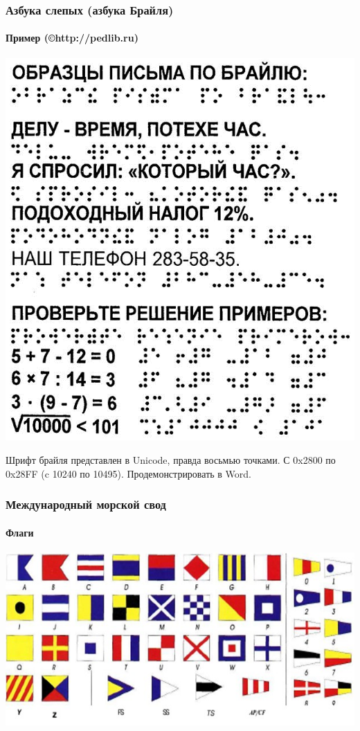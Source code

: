 \begin{frame}
    \frametitle{Азбука слепых (азбука Брайля)}
    \framesubtitle{Пример (\copyright http://pedlib.ru)}
    
    \begin{center}
        \includegraphics[height=.8\textheight]{fig/braileExample}
    \end{center}
\end{frame}

Шрифт брайля представлен в Unicode, правда восьмью точками. С 0x2800 по 0x28FF (c 10240 по 10495). Продемонстрировать в Word.

\begin{frame}
    \frametitle{Международный морской свод}
    \framesubtitle{Флаги}
    
    \begin{center}
        \includegraphics[width=.95\textwidth]{fig/signalFlags}
    \end{center}
\end{frame}

